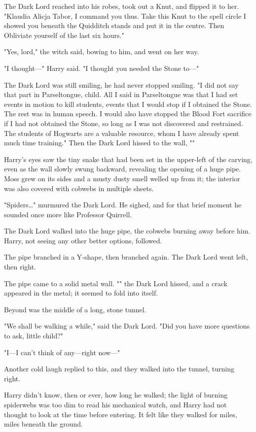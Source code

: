 The Dark Lord reached into his robes, took out a Knut, and flipped it to her.
"Klaudia Alicja Tabor, I command you thus. Take this Knut to the spell circle I
showed you beneath the Quidditch stands and put it in the centre. Then
Obliviate yourself of the last six hours."

"Yes, lord," the witch said, bowing to him, and went on her way.

"I thought---" Harry said. "I thought you needed the Stone to---"

The Dark Lord was still smiling, he had never stopped smiling. "I did not say
that part in Parseltongue, child. All I said in Parseltongue was that I had set
events in motion to kill students, events that I would stop if I obtained the
Stone. The rest was in human speech. I would also have stopped the Blood Fort
sacrifice if I had not obtained the Stone, so long as I was not discovered and
restrained. The students of Hogwarts are a valuable resource, whom I have
already spent much time training." Then the Dark Lord hissed to the wall,
""

Harry's eyes saw the tiny snake that had been set in the upper-left of the
carving, even as the wall slowly swung backward, revealing the opening of a
huge pipe. Moss grew on its sides and a musty dusty smell welled up from it;
the interior was also covered with cobwebs in multiple sheets.

"Spiders{\ldots}" murmured the Dark Lord. He sighed, and for that brief moment
he sounded once more like Professor Quirrell.

The Dark Lord walked into the huge pipe, the cobwebs burning away before him.
Harry, not seeing any other better options, followed.

The pipe branched in a Y-shape, then branched again. The Dark Lord went left,
then right.

The pipe came to a solid metal wall. "" the Dark Lord hissed, and a
crack appeared in the metal; it seemed to fold into itself.

Beyond was the middle of a long, stone tunnel.

"We shall be walking a while," said the Dark Lord. "Did you have more questions
to ask, little child?"

"I---I can't think of any---right now---"

Another cold laugh replied to this, and they walked into the tunnel, turning
right.

Harry didn't know, then or ever, how long he walked; the light of burning
spiderwebs was too dim to read his mechanical watch, and Harry had not thought
to look at the time before entering. It felt like they walked for miles, miles
beneath the ground.

